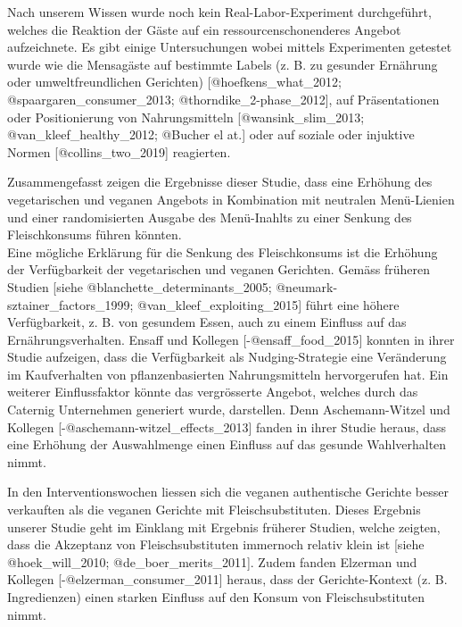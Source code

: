 \documentclass[12pt,ngerman,]{article}
\begin{document}
Nach unserem Wissen wurde noch kein Real-Labor-Experiment durchgeführt,
welches die Reaktion der Gäste auf ein ressourcenschonenderes Angebot
aufzeichnete. Es gibt einige Untersuchungen wobei mittels Experimenten
getestet wurde wie die Mensagäste auf bestimmte Labels (z. B. zu
gesunder Ernährung oder umweltfreundlichen Gerichten)
{[}@hoefkens\_what\_2012; @spaargaren\_consumer\_2013;
@thorndike\_2-phase\_2012{]}, auf Präsentationen oder Positionierung von
Nahrungsmitteln {[}@wansink\_slim\_2013; @van\_kleef\_healthy\_2012;
@Bucher el at.{]} oder auf soziale oder injuktive Normen
{[}@collins\_two\_2019{]} reagierten.

\par

Zusammengefasst zeigen die Ergebnisse dieser Studie, dass eine Erhöhung
des vegetarischen und veganen Angebots in Kombination mit neutralen
Menü-Lienien und einer randomisierten Ausgabe des Menü-Inahlts zu einer
Senkung des Fleischkonsums führen könnten.\\
Eine mögliche Erklärung für die Senkung des Fleischkonsums ist die
Erhöhung der Verfügbarkeit der vegetarischen und veganen Gerichten.
Gemäss früheren Studien {[}siehe @blanchette\_determinants\_2005;
@neumark-sztainer\_factors\_1999; @van\_kleef\_exploiting\_2015{]} führt
eine höhere Verfügbarkeit, z. B. von gesundem Essen, auch zu einem
Einfluss auf das Ernährungsverhalten. Ensaff und Kollegen
{[}-@ensaff\_food\_2015{]} konnten in ihrer Studie aufzeigen, dass die
Verfügbarkeit als Nudging-Strategie eine Veränderung im Kaufverhalten
von pflanzenbasierten Nahrungsmitteln hervorgerufen hat. Ein weiterer
Einflussfaktor könnte das vergrösserte Angebot, welches durch das
Caternig Unternehmen generiert wurde, darstellen. Denn Aschemann-Witzel
und Kollegen {[}-@aschemann-witzel\_effects\_2013{]} fanden in ihrer
Studie heraus, dass eine Erhöhung der Auswahlmenge einen Einfluss auf
das gesunde Wahlverhalten nimmt.

\par

In den Interventionswochen liessen sich die veganen authentische
Gerichte besser verkauften als die veganen Gerichte mit
Fleischsubstituten. Dieses Ergebnis unserer Studie geht im Einklang mit
Ergebnis früherer Studien, welche zeigten, dass die Akzeptanz von
Fleischsubstituten immernoch relativ klein ist {[}siehe
@hoek\_will\_2010; @de\_boer\_merits\_2011{]}. Zudem fanden Elzerman und
Kollegen {[}-@elzerman\_consumer\_2011{]} heraus, dass der
Gerichte-Kontext (z. B. Ingredienzen) einen starken Einfluss auf den
Konsum von Fleischsubstituten nimmt.
\end{document}
